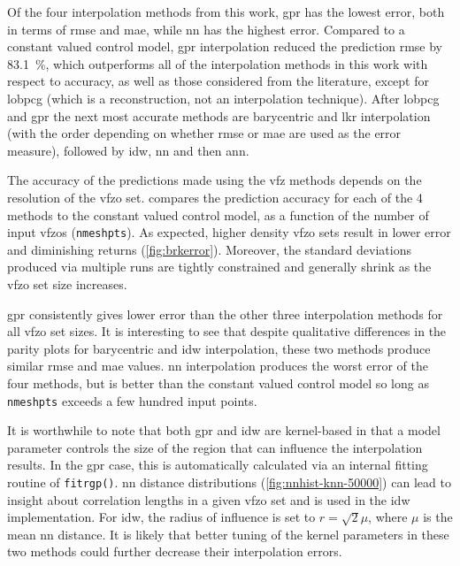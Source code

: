 \documentclass[final,twocolumn,12pt]{elsarticle}
\newcommand{\inpt}{input}
\newcommand{\inptvar}{nmeshpts}
\newcommand{\gprrmsePercReduction}{83.1}
\begin{document}
Of the four interpolation methods from this work, \Gls{gpr} has the lowest error, both in terms of \gls{rmse} and \gls{mae}, while \gls{nn} has the highest error. Compared to a constant valued control model, \gls{gpr} interpolation reduced the prediction \gls{rmse} by \SI{\gprrmsePercReduction}{\percent}, which outperforms all of the interpolation methods in this work with respect to accuracy, as well as those considered from the literature, except for \gls{lobpcg} (which is a reconstruction, not an interpolation technique). After \gls{lobpcg} and \gls{gpr} the next most accurate methods are barycentric and \gls{lkr} interpolation (with the order depending on whether \gls{rmse} or \gls{mae} are used as the error measure), followed by \gls{idw}, \gls{nn} and then \gls{ann}.

The accuracy of the predictions made using the \gls{vfz} methods depends on the resolution of the \gls{vfzo} set.  compares the prediction accuracy for each of the 4 methods to the constant valued control model, as a function of the number of \inpt{} \glspl{vfzo} (\texttt{\inptvar{}}). As expected, higher density \gls{vfzo} sets result in lower error and diminishing returns (\cref{fig:brkerror}). Moreover, the standard deviations produced via multiple runs are tightly constrained and generally shrink as the \gls{vfzo} set size increases. 

\Gls{gpr} consistently gives lower error than the other three interpolation methods for all \gls{vfzo} set sizes. It is interesting to see that despite qualitative differences in the parity plots for barycentric and \gls{idw} interpolation, these two methods produce similar \gls{rmse} and \gls{mae} values. \Gls{nn} interpolation produces the worst error of the four methods, but is better than the constant valued control model so long as \texttt{\inptvar{}} exceeds a few hundred \inpt{} points. 

It is worthwhile to note that both \gls{gpr} and \gls{idw} are kernel-based in that a model parameter controls the size of the region that can influence the interpolation results. In the \gls{gpr} case, this is automatically calculated via an internal fitting routine of \texttt{fitrgp()}. \gls{nn} distance distributions (\cref{fig:nnhist-knn-50000}) can lead to insight about correlation lengths in a given \gls{vfzo} set and is used in the \gls{idw} implementation. For \gls{idw}, the radius of influence is set to $r=\sqrt{2} \mu$, where $\mu$ is the mean \gls{nn} distance. It is likely that better tuning of the kernel parameters in these two methods could further decrease their interpolation errors.
\end{document}
